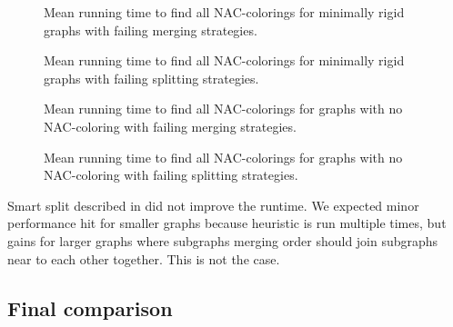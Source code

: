 \begin{figure}[thbp]
	\centering
	\scalebox{\BenchFigureScale}{}
	\caption[Mean runtime for minimally rigid graphs (some) (with failing).]{
		Mean running time to find all NAC-colorings for minimally rigid graphs with failing merging strategies.}%
	\label{fig:graph_mimimally_rigid_failing_merging_first_runtime}
\end{figure}%
\begin{figure}[thbp]
	\centering
	\scalebox{\BenchFigureScale}{}
	\caption[Mean runtime for minimally rigid graphs (some) (with failing).]{
		Mean running time to find all NAC-colorings for minimally rigid graphs with failing splitting strategies.}%
	\label{fig:graph_mimimally_rigid_failing_split_first_runtime}
\end{figure}%
\begin{figure}[thbp]
	\centering
	\scalebox{\BenchFigureScale}{}
	\caption[Mean runtime for graphs with no NAC-coloring (with failing).]{
		Mean running time to find all NAC-colorings for graphs with no NAC-coloring with failing merging strategies.}%
	\label{fig:graph_no_nac_coloring_generated_rigid_failing_merging_first_runtime}
\end{figure}%
\begin{figure}[thbp]
	\centering
	\scalebox{\BenchFigureScale}{}
	\caption[Mean runtime for graphs with no NAC-coloring (with failing).]{
		Mean running time to find all NAC-colorings for graphs with no NAC-coloring with failing splitting strategies.}%
	\label{fig:graph_no_nac_coloring_generated_rigid_failing_split_first_runtime}
\end{figure}%

Smart split described in 
did not improve the runtime.
We expected minor performance hit for smaller graphs because heuristic is run
multiple times, but gains for larger graphs where subgraphs merging order
should join subgraphs near to each other together. This is not the case.

\subsection{Final comparison}

